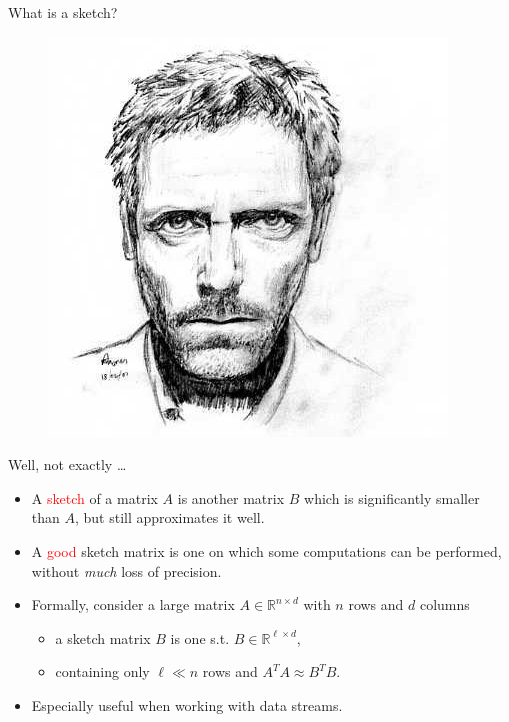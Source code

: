 \documentclass[first=dgreen,second=purple,logo=redque]{aaltoslides}
\begin{document}
\begin{frame}[allowframebreaks=1]{What is a sketch?}

\begin{figure}
  \includegraphics[scale=0.6]{plots/sketch1}
 \label{fig:sketch1}
\end{figure}

Well, not exactly \ldots

\framebreak

\begin{itemize}
	\item A \textcolor{red}{sketch} of a matrix $A$ is another matrix $B$ which is significantly
  \textcolor{dgreen}{smaller} than $A$, but still approximates it \textcolor{dgreen}{well}.
	\item A \textcolor{red}{good} sketch matrix is one on which some computations can
  be performed, \textcolor{dgreen}{without} \textit{much} loss of precision.
	\item Formally, consider a large matrix $A \in \mathbb{R}^{n\times d}$ with $n$ rows and $d$
columns
	\begin{itemize}
		\item a sketch matrix $B$ is one s.t. $B \in \mathbb{R}^{\ell \times d}$,
		\item containing only $\ell \ll n$ rows and $A^TA \approx B^TB$.
	\end{itemize}
\item Especially \textcolor{dgreen}{useful} when working with data streams.
\end{itemize}
\end{frame}
\end{document}
